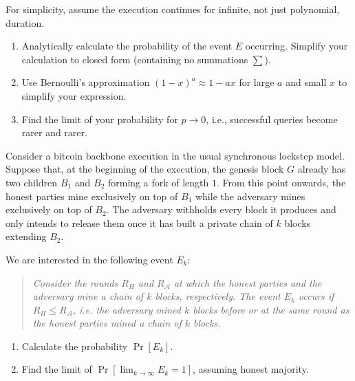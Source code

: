\begin{problems}
          For simplicity, assume the execution continues for infinite, not just
          polynomial, duration.

          \begin{enumerate}
            \item Analytically calculate the probability of the event $E$
                  occurring. Simplify your calculation to closed form
                  (containing no summations $\sum$).
            \item Use Bernoulli's approximation $(1 - x)^a \approx 1 - ax$ for
                  large $a$ and small $x$ to simplify your expression.
            \item Find the limit of your probability for $p \to 0$, i.e.,
                  successful queries become rarer and rarer.
          \end{enumerate}

          \item Consider a bitcoin backbone execution in the usual synchronous lockstep model.
                Suppose that, at the beginning of the execution, the genesis block $G$ already
                has two children $B_1$ and $B_2$ forming a fork of length $1$. From this point
                onwards, the honest parties mine exclusively on top of $B_1$ while the adversary
                mines exclusively on top of $B_2$. The adversary withholds every block it
                produces and only intends to release them once it has built a private chain of
                $k$ blocks extending $B_2$.

                We are interested in the following event $E_k$:
                \begin{quote}
                \itshape Consider the rounds $R_H$ and $R_{\mathcal{A}}$ at which the honest
                parties and the adversary mine a chain of $k$ blocks, respectively. The event
                $E_k$ occurs if $R_H \leq R_{\mathcal{A}}$, i.e. the adversary mined $k$
                blocks before or at the same round as the honest parties mined a chain of $k$
                blocks.
                \end{quote}
                \begin{enumerate}
                \item Calculate the probability $\Pr[E_k]$.
                \item Find the limit of $\Pr[\lim_{k \to \infty} E_k = 1]$, assuming honest
                    majority.
                \end{enumerate}


\end{problems}
